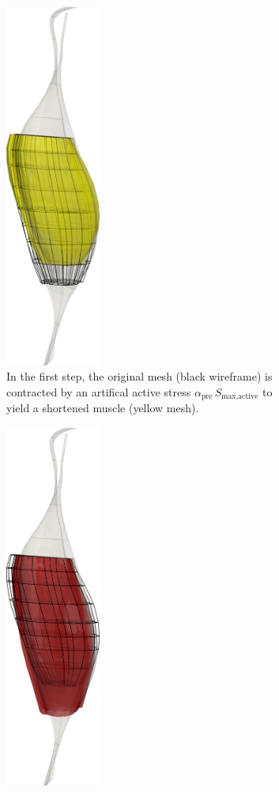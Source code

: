 \begin{figure}
  \centering%
  \hfill
  \begin{subfigure}[t]{0.48\textwidth}%
    \centering%
    \includegraphics[height=12cm]{images/results/application/neuromuscular_prestretch_1.png}%
    \caption{In the first step, the original mesh (black wireframe) is contracted by an artifical active stress $\alpha_\text{pre}\,S_\text{max,active}$ to yield a shortened muscle (yellow mesh).}%
    \label{fig:neuromuscular_prestretch_1}%
  \end{subfigure}\hfill
  \begin{subfigure}[t]{0.48\textwidth}%
    \centering%
    \includegraphics[height=12cm]{images/results/application/neuromuscular_prestretch_2.png}%

\end{subfigure}
\end{figure}
